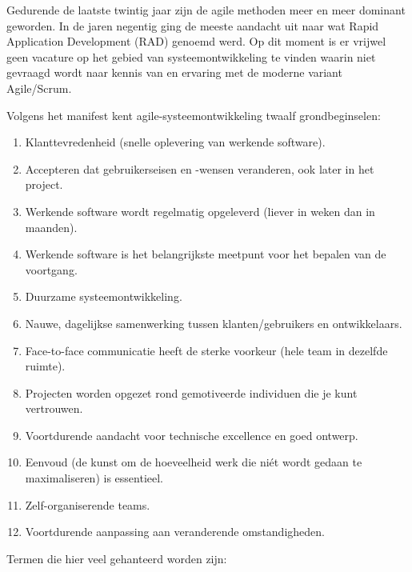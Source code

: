 Gedurende de laatste twintig jaar zijn de agile methoden meer en meer dominant geworden. In de jaren negentig ging de meeste aandacht uit naar wat Rapid Application Development (RAD) genoemd werd. Op dit moment is er vrijwel geen vacature op het gebied van systeemontwikkeling te vinden waarin niet gevraagd wordt naar kennis van en ervaring met de moderne variant Agile/Scrum.

Volgens het manifest kent agile-systeemontwikkeling twaalf grondbeginselen:

\begin{enumerate}
    \item Klanttevredenheid (snelle oplevering van werkende software).
    \item Accepteren dat gebruikerseisen en -wensen veranderen, ook later in het project.
    \item Werkende software wordt regelmatig opgeleverd (liever in weken dan in maanden).
    \item Werkende software is het belangrijkste meetpunt voor het bepalen van de voortgang.
    \item Duurzame systeemontwikkeling.
    \item Nauwe, dagelijkse samenwerking tussen klanten/gebruikers en ontwikkelaars.
    \item Face-to-face communicatie heeft de sterke voorkeur (hele team in dezelfde ruimte).
    \item Projecten worden opgezet rond gemotiveerde individuen die je kunt vertrouwen.
    \item Voortdurende aandacht voor technische excellence en goed ontwerp.
    \item Eenvoud (de kunst om de hoeveelheid werk die niét wordt gedaan te maximaliseren) is essentieel.
    \item Zelf-organiserende teams.
    \item Voortdurende aanpassing aan veranderende omstandigheden.
\end{enumerate}

Termen die hier veel gehanteerd worden zijn:

